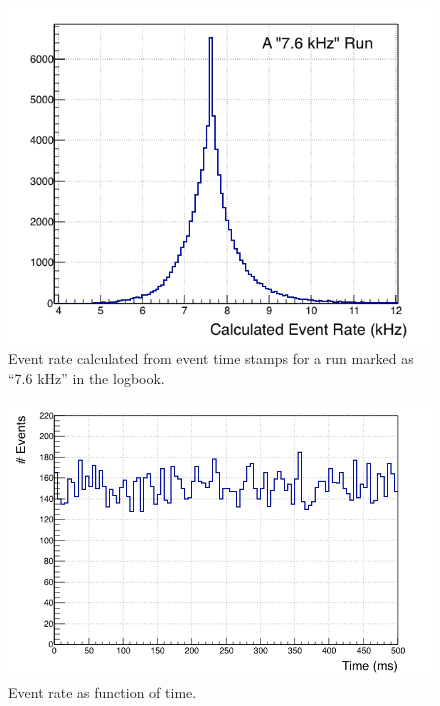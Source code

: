 \documentclass[amsmath,amssymb,notitlepage,12pt]{revtex4-1}
\begin{document}
\begin{figure}[htbp]\centering
    \includegraphics[width=12cm]{pics/7kHz.png}
    \caption{Event rate calculated from event time stamps for a run marked as ``7.6 kHz'' in the logbook. \label{fig:7.6}}
\end{figure}

\begin{figure}[htbp]\centering
    \includegraphics[width=12cm]{pics/nrate.png}
    \caption{Event rate as function of time.\label{fig:nrate}}
\end{figure}
\end{document}
